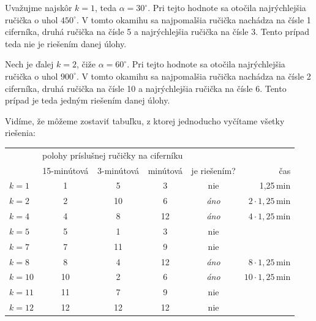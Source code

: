 Uvažujme najskôr $k = 1$, teda $\alpha = 30^{\circ}$. Pri tejto hodnote sa otočila najrýchlejšia ručička o uhol $450^{\circ}$. V tomto okamihu sa najpomalšia ručička nachádza na čísle 1 ciferníka, druhá ručička na čísle 5 a najrýchlejšia ručička na čísle 3. Tento prípad teda nie je riešením danej úlohy.

Nech je ďalej $k = 2$, čiže $\alpha = 60^{\circ}$. Pri tejto hodnote sa otočila najrýchlejšia ručička o uhol $900^{\circ}$. V tomto okamihu sa najpomalšia ručička nachádza na čísle 2 ciferníka, druhá ručička na čísle 10 a najrýchlejšia ručička na čísle 6. Tento prípad je teda jedným riešením danej úlohy.

Vidíme, že môžeme zostaviť tabuľku, z ktorej jednoducho vyčítame všetky riešenia:
\begin{center}
\begin{tabular}{l c c c c r}
\hline
 & \multicolumn{3}{l}{polohy príslušnej ručičky na ciferníku} &  & \\
 & 15-minútová & 3-minútová & minútová & je riešením? & čas \\
 \hline
 $k=1$ & 1 & 5 & 3 & nie & 1,25\,min \\
 $k=2$ & 2 & 10 & 6 & \textit{áno} & $2\cdot1,25$\,min \\
 $k=4$ & 4 & 8 & 12 & \textit{áno} & $4\cdot1,25$\,min \\
 $k=5$ & 5 & 1 & 3 & nie &  \\
 $k=7$ & 7 & 11 & 9 & nie &  \\
 $k=8$ & 8 & 4 & 12 & \textit{áno} & $8\cdot 1,25$\,min \\
 $k=10$ & 10 & 2 & 6 & \textit{áno} & $10\cdot1,25$\,min \\
 $k=11$ & 11 & 7 & 9 & nie & \\
 $k=12$ & 12 & 12 & 12 & nie & \\
 \hline
\end{tabular}
\end{center}

